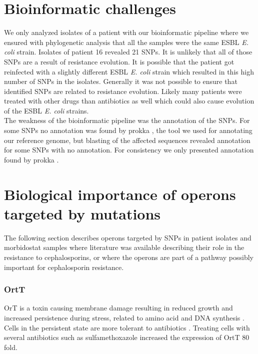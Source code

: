 \section{Bioinformatic challenges}
We only analyzed isolates of a patient with our bioinformatic pipeline where we ensured with phylogenetic analysis that all the samples were the same ESBL \textit{E. coli} strain. Isolates of patient 16 revealed 21 SNPs. It is unlikely that all of those SNPs are a result of resistance evolution. It is possible that the patient got reinfected with a slightly different ESBL \textit{E. coli} strain which resulted in this high number of SNPs in the isolates. Generally it was not possible to ensure that identified SNPs are related to resistance evolution. Likely many patients were treated with other drugs than antibiotics as well which could also cause evolution of the ESBL \textit{E. coli} strains. \\
The weakness of the bioinformatic pipeline was the annotation of the SNPs. For some SNPs no annotation was found by prokka \cite{seemann_prokka:_2014}, the tool we used for annotating our reference genome, but blasting of the affected sequences revealed annotation for some SNPs with no annotation.
For consistency we only presented annotation found by prokka \cite{seemann_prokka:_2014}. 

\section{Biological importance of operons targeted by mutations}
The following section describes operons targeted by SNPs in patient isolates and morbidostat samples where literature was available describing their role in the resistance to cephalosporins, or where the operons are part of a pathway possibly important for cephalosporin resistance.

\subsubsection{OrtT}
OrT is a toxin causing membrane damage resulting in reduced growth and increased persistence during stress, related to amino acid and DNA synthesis \cite{islam_orphan_2015}. Cells in the persistent state are more tolerant to antibiotics \cite{islam_orphan_2015}. Treating cells with several antibiotics such as sulfamethoxazole increased the expression of OrtT 80 fold. 

